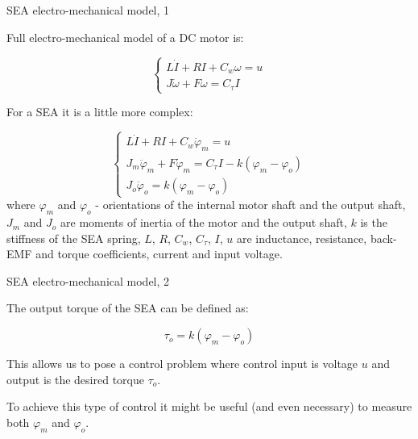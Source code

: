 \documentclass{beamer}
\begin{document}
\begin{frame}{SEA electro-mechanical model, 1}
	\begin{flushleft}
		
		Full electro-mechanical model of a DC motor is:
		
		\begin{equation}
			\begin{cases}
				L \dot I + RI + C_w \omega = u \\
				J \dot \omega + F \omega = C_\tau I
			\end{cases}
		\end{equation}
	
		\bigskip
		
		For a SEA it is a little more complex:
		
		\begin{equation}
			\begin{cases}
				L \dot I + RI + C_w \dot \varphi_m = u \\
				J_m \ddot \varphi_m + F \dot \varphi_m = C_\tau I - k (\varphi_m - \varphi_o) \\
				J_o \ddot \varphi_o = k (\varphi_m - \varphi_o)
			\end{cases}
		\end{equation}
		where $\varphi_m$ and $\varphi_o$ - orientations of the internal motor shaft and the output shaft, 
		$J_m$ and $J_o$ are moments of inertia of the motor and the output shaft, 
		$k$ is the stiffness of the SEA spring, 
		$L$, $R$, $C_w$, $C_\tau$, $I$, $u$ are inductance, resistance, back-EMF and torque coefficients, current and input voltage.
		
		
	\end{flushleft}
\end{frame}



\begin{frame}{SEA electro-mechanical model, 2}
	\begin{flushleft}
		
		The output torque of the SEA can be defined as:
		
		\begin{equation}
			\tau_o = k (\varphi_m - \varphi_o)
		\end{equation}
		
		This allows us to pose a control problem where control input is voltage $u$ and output is the desired torque $\tau_o$.
		
		\bigskip
		
		To achieve this type of control it might be useful (and even necessary) to measure both $\varphi_m$ and $\varphi_o$.
		
		
	\end{flushleft}
\end{frame}
\end{document}
